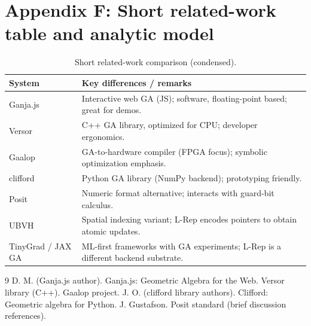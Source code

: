 \documentclass[11pt]{article}
\theoremstyle{definition}
\theoremstyle{plain}
\begin{document}
\section{Appendix F: Short related-work table and analytic model}
\begin{table}[h!]
\centering
\begin{tabular}{l p{8cm}}
\toprule
System & Key differences / remarks \\
\midrule
Ganja.js & Interactive web GA (JS); software, floating-point based; great for demos. \\
Versor & C++ GA library, optimized for CPU; developer ergonomics. \\
Gaalop & GA-to-hardware compiler (FPGA focus); symbolic optimization emphasis. \\
clifford & Python GA library (NumPy backend); prototyping friendly. \\
Posit & Numeric format alternative; interacts with guard-bit calculus. \\
UBVH & Spatial indexing variant; L-Rep encodes pointers to obtain atomic updates. \\
TinyGrad / JAX GA & ML-first frameworks with GA experiments; L-Rep is a different backend substrate. \\
\bottomrule
\end{tabular}
\caption{Short related-work comparison (condensed).}
\end{table}


\begin{thebibliography}{9}
 D. M. (Ganja.js author). Ganja.js: Geometric Algebra for the Web.
 Versor library (C++).
 Gaalop project.
 J. O. (clifford library authors). Clifford: Geometric algebra for Python.
 J. Gustafson. Posit standard (brief discussion references).
\end{thebibliography}
\end{document}
